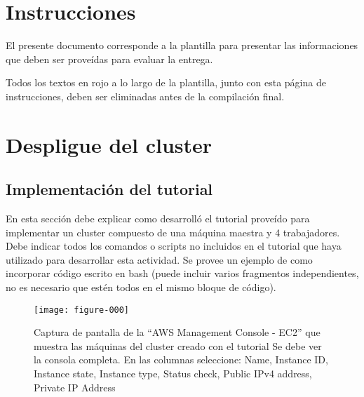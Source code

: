 \documentclass[12pt,letterpaper,twoside]{article}
\begin{document}

{\color{red}
\section*{Instrucciones}

El presente documento corresponde a la plantilla para presentar las informaciones que deben ser proveídas para evaluar la entrega.

Todos los textos en rojo a lo largo de la plantilla, junto con esta página de instrucciones, deben ser eliminadas antes de la compilación final.

\newpage
}


\section{Despligue del cluster}

\subsection{Implementación del tutorial}

{\color{red} En esta sección debe explicar como desarrolló el tutorial proveído para implementar un cluster compuesto de una máquina maestra y 4 trabajadores. Debe indicar todos los comandos o scripts no incluidos en el tutorial que haya utilizado para desarrollar esta actividad. Se provee un ejemplo de como incorporar código escrito en bash (puede incluir varios fragmentos independientes, no es necesario que estén todos en el mismo bloque de código).}

\begin{code}[H]

\end{code}

\begin{figure}[H]
    \centering
    \texttt{[image: figure-000]}
    \caption{Captura de pantalla de la ``AWS Management Console - EC2'' que muestra las máquinas del cluster creado con el tutorial
    {\color{red} Se debe ver la consola completa. En las columnas seleccione: Name, Instance ID, Instance state, Instance type, Status check, Public IPv4 address, Private IP Address}}
    \label{fig:001}
\end{figure}
\end{document}
